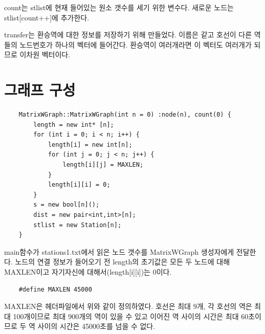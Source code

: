 \documentclass{oblivoir}
\begin{document}
count는 stlist에 현재 들어있는 원소 갯수를 세기 위한 변수다. 새로운 노드는 stlist[count++]에 추가한다.

transfer는 환승역에 대한 정보를 저장하기 위해 만들었다.
이름은 같고 호선이 다른 역들의 노드번호가 하나의 벡터에 들어간다. 환승역이 여러개라면 이 벡터도 여러개가 되므로 이차원 벡터이다.

\section{그래프 구성}

\begin{verbatim}
    MatrixWGraph::MatrixWGraph(int n = 0) :node(n), count(0) {
    	length = new int* [n];
    	for (int i = 0; i < n; i++) {
    		length[i] = new int[n];
    		for (int j = 0; j < n; j++) {
    			length[i][j] = MAXLEN;
    		}
    		length[i][i] = 0;
    	}
    	s = new bool[n]();
    	dist = new pair<int,int>[n];
    	stlist = new Station[n];
    }
\end{verbatim}
main함수가 stations1.txt에서 읽은 노드 갯수를 MatrixWGraph 생성자에게 전달한다.
노드의 연결 정보가 들어오기 전 length의 초기값은 모든 두 노드에 대해 MAXLEN이고 자기자신에 대해서(length[i][i])는 0이다. 
\begin{verbatim}
    #define MAXLEN 45000
\end{verbatim}
MAXLEN은 헤더파일에서 위와 같이 정의하였다. 호선은 최대 9개, 각 호선의 역은 최대 100개이므로 최대 900개의 역이 있을 수 있고 이어진 역 사이의 시간은 최대 60초이므로 두 역 사이의 시간은 45000초를 넘을 수 없다.
\end{document}
